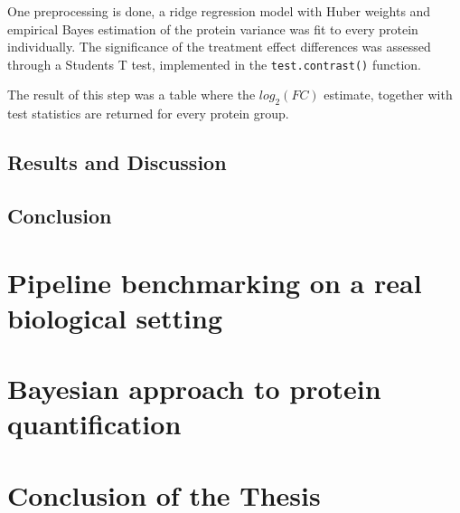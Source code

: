\documentclass[11pt, a4paper]{report}
\begin{document}
One preprocessing is done, a ridge regression model with Huber weights and empirical Bayes estimation of the protein variance was fit to every protein individually. The significance of the treatment effect differences was assessed through a Student\textquotesingle s T test, implemented in the \texttt{test.contrast()} function.

The result of this step was a table where the $log_2(FC)$ estimate, together with test statistics are returned for every protein group.



\section{Results and Discussion}




\section{Conclusion}


\chapter{Pipeline benchmarking on a real biological setting}
\label{chap:benchmark}

\chapter{Bayesian approach to protein quantification}
\label{chap:model}


\chapter{Conclusion of the Thesis}
\label{chap:conclusion}



\footnotesize{}
\end{document}
